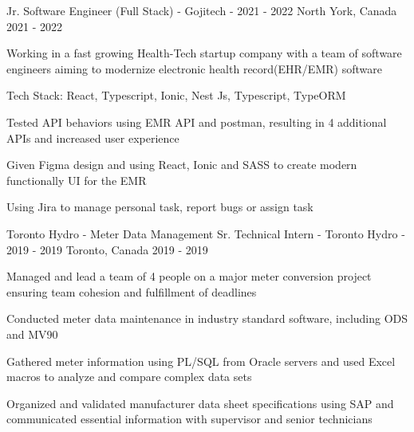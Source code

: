 


\begin{cventries}


\cventry
{} %
{Jr. Software Engineer (Full Stack) - Gojitech - 2021 - 2022} %
{North York, Canada} %
{2021 - 2022} %
{ %
\begin{cvitems}
\item {Working in a fast growing Health-Tech startup company with a team of software engineers aiming to modernize electronic health record(EHR/EMR) software}
\item {Tech Stack: React, Typescript, Ionic, Nest Js, Typescript, TypeORM}
\item {Tested API behaviors using EMR API and postman, resulting in 4 additional APIs and increased user experience}
\item {Given Figma design and using React, Ionic and SASS to create modern functionally UI for the EMR}
\item {Using Jira to manage personal task, report bugs or assign task}
\end{cvitems}
}




\cventry
{Toronto Hydro - Meter Data Management} %
{Sr. Technical Intern - Toronto Hydro - 2019 - 2019} %
{Toronto, Canada} %
{2019 - 2019} %
{ %
\begin{cvitems}
\item {Managed and lead a team of 4 people on a major meter conversion project ensuring team cohesion and fulfillment of deadlines}
\item {Conducted meter data maintenance in industry standard software, including ODS and MV90}
\item {Gathered meter information using PL/SQL from Oracle servers and used Excel macros to analyze and compare complex data sets}
\item {Organized and validated manufacturer data sheet specifications using SAP and communicated essential information with supervisor and senior technicians}
\end{cvitems}
}




\end{cventries}
